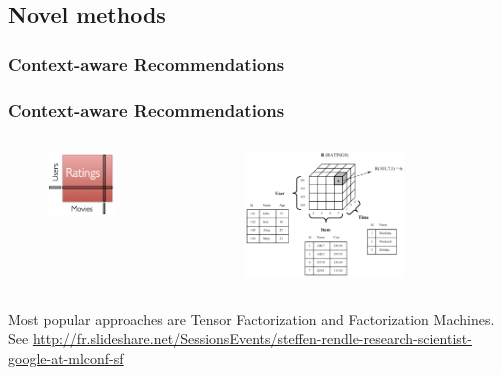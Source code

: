 \documentclass[10pt,handout,english]{beamer}
\begin{document}
		\subsection{Novel methods}
			\subsubsection{Context-aware Recommendations}
			\begin{frame}
			\frametitle{Context-aware Recommendations}
				\begin{columns}[c]
						\begin{figure}[h!]
			    		    \centering
			                \includegraphics[width=0.7\textwidth]{matrix_rating.png}
		             	\end{figure}
		            	\begin{figure}[h!]
			            	\centering
			                \includegraphics[width=0.7\textwidth]{context_recommendation.png}
			            \end{figure}
			        \end{columns}
			    Most popular approaches are Tensor Factorization and Factorization Machines.\\ See \url{http://fr.slideshare.net/SessionsEvents/steffen-rendle-research-scientist-google-at-mlconf-sf}

			\end{frame}
\end{document}
